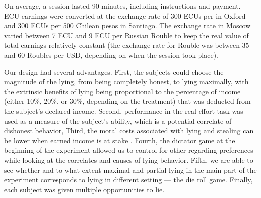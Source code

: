 \documentclass[12pt]{article}
\begin{document}
\par On average, a session lasted 90 minutes, including instructions and payment. ECU earnings were converted at the exchange rate of 300 ECUs per  in Oxford and 300 ECUs per 500 Chilean pesos in Santiago. The exchange rate in Moscow varied between 7 ECU and 9 ECU per Russian Rouble to keep the real value of total earnings relatively constant (the exchange rate for Rouble was between 35 and 60 Roubles per USD, depending on when the session took place).

\par Our design had several advantages. First, the subjects could choose the magnitude of the lying, from being completely honest, to lying maximally, with the extrinsic benefits of lying being proportional to the percentage of income (either 10\%, 20\%, or 30\%, depending on the treatment) that was deducted from the subject’s declared income.\footnotemark{} 
Second, performance in the real effort task was used as a measure of the subject’s ability, which is a potential correlate of dishonest behavior,\footnotemark{} 
Third, the moral costs associated with lying and stealing can be lower when earned income is at stake \citep{gravert2013luck}.
Fourth, the dictator game at the beginning of the experiment allowed us to control for other-regarding preferences while looking at the correlates and causes of lying behavior.\footnotemark{} 
Fifth, we are able to see whether and to what extent maximal and partial lying in the main part of the experiment corresponds to lying in different setting --- the die roll game.  
Finally, each subject was given multiple opportunities to lie. 
\end{document}
